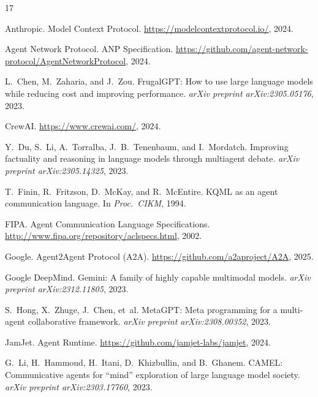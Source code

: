 \documentclass[11pt,a4paper]{article}
\begin{document}
\begin{thebibliography}{17}

Anthropic.
\newblock Model Context Protocol.
\newblock \url{https://modelcontextprotocol.io/}, 2024.

Agent Network Protocol.
\newblock ANP Specification.
\newblock \url{https://github.com/agent-network-protocol/AgentNetworkProtocol}, 2024.

L.~Chen, M.~Zaharia, and J.~Zou.
\newblock FrugalGPT: How to use large language models while reducing cost and improving performance.
\newblock \emph{arXiv preprint arXiv:2305.05176}, 2023.

CrewAI.
\newblock \url{https://www.crewai.com/}, 2024.

Y.~Du, S.~Li, A.~Torralba, J.~B.~Tenenbaum, and I.~Mordatch.
\newblock Improving factuality and reasoning in language models through multiagent debate.
\newblock \emph{arXiv preprint arXiv:2305.14325}, 2023.

T.~Finin, R.~Fritzson, D.~McKay, and R.~McEntire.
\newblock KQML as an agent communication language.
\newblock In \emph{Proc.\ CIKM}, 1994.

FIPA.
\newblock Agent Communication Language Specifications.
\newblock \url{http://www.fipa.org/repository/aclspecs.html}, 2002.

Google.
\newblock Agent2Agent Protocol (A2A).
\newblock \url{https://github.com/a2aproject/A2A}, 2025.

Google DeepMind.
\newblock Gemini: A family of highly capable multimodal models.
\newblock \emph{arXiv preprint arXiv:2312.11805}, 2023.

S.~Hong, X.~Zhuge, J.~Chen, et~al.
\newblock MetaGPT: Meta programming for a multi-agent collaborative framework.
\newblock \emph{arXiv preprint arXiv:2308.00352}, 2023.

JamJet.
\newblock Agent Runtime.
\newblock \url{https://github.com/jamjet-labs/jamjet}, 2024.

G.~Li, H.~Hammoud, H.~Itani, D.~Khizbullin, and B.~Ghanem.
\newblock CAMEL: Communicative agents for ``mind'' exploration of large language model society.
\newblock \emph{arXiv preprint arXiv:2303.17760}, 2023.


\end{thebibliography}
\end{document}
